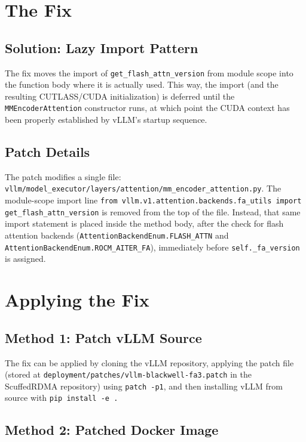\documentclass[10pt,letterpaper]{article}
\begin{document}
\section{The Fix}

\subsection{Solution: Lazy Import Pattern}

The fix moves the import of \texttt{get\_flash\_attn\_version} from module scope into the function body where it is actually used. This way, the import (and the resulting CUTLASS/CUDA initialization) is deferred until the \texttt{MMEncoderAttention} constructor runs, at which point the CUDA context has been properly established by vLLM's startup sequence.

\subsection{Patch Details}

The patch modifies a single file: \texttt{vllm/model\_executor/layers/attention/mm\_encoder\_attention.py}. The module-scope import line \texttt{from vllm.v1.attention.backends.fa\_utils import get\_flash\_attn\_version} is removed from the top of the file. Instead, that same import statement is placed inside the method body, after the check for flash attention backends (\texttt{AttentionBackendEnum.FLASH\_ATTN} and \texttt{AttentionBackendEnum.ROCM\_AITER\_FA}), immediately before \texttt{self.\_fa\_version} is assigned.

\section{Applying the Fix}

\subsection{Method 1: Patch vLLM Source}

The fix can be applied by cloning the vLLM repository, applying the patch file (stored at \texttt{deployment/patches/vllm-blackwell-fa3.patch} in the ScuffedRDMA repository) using \texttt{patch -p1}, and then installing vLLM from source with \texttt{pip install -e .}

\subsection{Method 2: Patched Docker Image}
\end{document}
